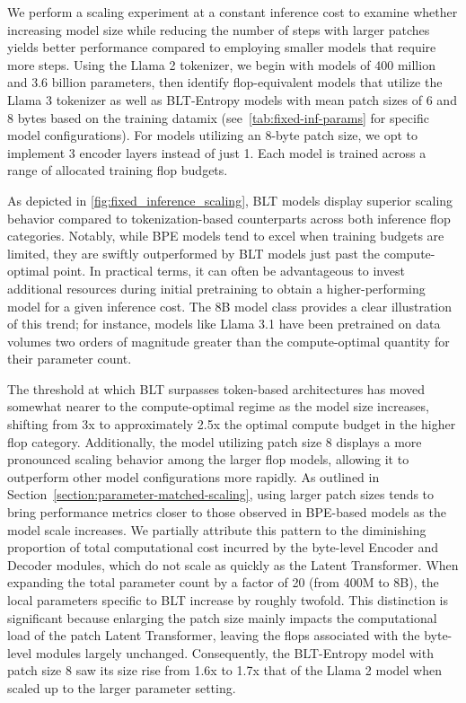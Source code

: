 We perform a scaling experiment at a constant inference cost to examine whether increasing model size while reducing the number of steps with larger patches yields better performance compared to employing smaller models that require more steps. Using the Llama 2 tokenizer, we begin with models of 400 million and 3.6 billion parameters, then identify flop-equivalent models that utilize the Llama 3 tokenizer as well as {\textsc BLT}-Entropy models with mean patch sizes of 6 and 8 bytes based on the training datamix (see~\autoref{tab:fixed-inf-params} for specific model configurations). For models utilizing an 8-byte patch size, we opt to implement 3 encoder layers instead of just 1. Each model is trained across a range of allocated training flop budgets.

As depicted in \autoref{fig:fixed_inference_scaling}, {\textsc BLT} models display superior scaling behavior compared to tokenization-based counterparts across both inference flop categories. Notably, while BPE models tend to excel when training budgets are limited, they are swiftly outperformed by {\textsc BLT} models just past the compute-optimal point. In practical terms, it can often be advantageous to invest additional resources during initial pretraining to obtain a higher-performing model for a given inference cost. The 8B model class provides a clear illustration of this trend; for instance, models like Llama 3.1 have been pretrained on data volumes two orders of magnitude greater than the compute-optimal quantity for their parameter count.

The threshold at which {\textsc BLT} surpasses token-based architectures has moved somewhat nearer to the compute-optimal regime as the model size increases, shifting from 3x to approximately 2.5x the optimal compute budget in the higher flop category. Additionally, the model utilizing patch size 8 displays a more pronounced scaling behavior among the larger flop models, allowing it to outperform other model configurations more rapidly. As outlined in Section~\ref{section:parameter-matched-scaling}, using larger patch sizes tends to bring performance metrics closer to those observed in BPE-based models as the model scale increases. We partially attribute this pattern to the diminishing proportion of total computational cost incurred by the byte-level Encoder and Decoder modules, which do not scale as quickly as the Latent Transformer. When expanding the total parameter count by a factor of 20 (from 400M to 8B), the local parameters specific to {\textsc BLT} increase by roughly twofold. This distinction is significant because enlarging the patch size mainly impacts the computational load of the patch Latent Transformer, leaving the flops associated with the byte-level modules largely unchanged. Consequently, the {\textsc BLT}-Entropy model with patch size 8 saw its size rise from 1.6x to 1.7x that of the Llama 2 model when scaled up to the larger parameter setting.

